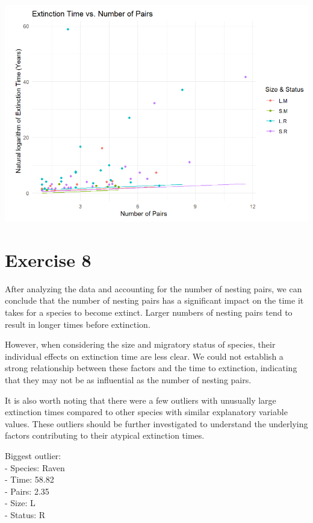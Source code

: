 \documentclass{article}
\begin{document}
\begin{center}
\includegraphics[scale=0.5]{graphs/graph7.png}
\end{center}

\section{Exercise 8}

After analyzing the data and accounting for the number of nesting pairs,
we can conclude that the number of nesting pairs has a significant
impact on the time it takes for a species to become extinct. Larger
numbers of nesting pairs tend to result in longer times before
extinction.

However, when considering the size and migratory status of species,
their individual effects on extinction time are less clear. We could not
establish a strong relationship between these factors and the time to
extinction, indicating that they may not be as influential as the number
of nesting pairs.

It is also worth noting that there were a few outliers with unusually
large extinction times compared to other species with similar
explanatory variable values. These outliers should be further
investigated to understand the underlying factors contributing to their
atypical extinction times.

Biggest outlier: \\
- Species: Raven \\
- Time: 58.82 \\
- Pairs: 2.35 \\
- Size: L \\ 
- Status: R \\
\end{document}
